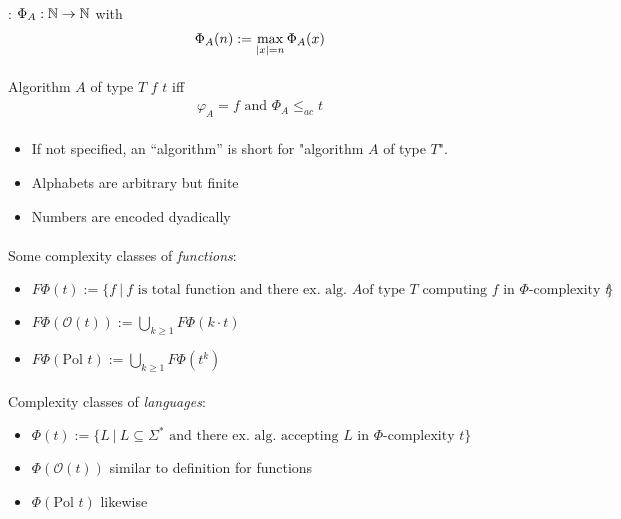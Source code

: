 \documentclass[10pt,twocolumn]{article}
\begin{document}
\paragraph{} : $\Phi_A : \mathbb{N}
\rightarrow \mathbb{N}$ with
\begin{align*}
  \Phi_A(n) := \max_{\lvert x \rvert=n} \Phi_A(x)
\end{align*}

\paragraph{} Algorithm $A$ of type $T$  $f$  $t$ iff
\begin{align*}
\text{
  $\varphi_A=f$ and $\Phi_A \leq_{ac} t$
  }
\end{align*}

\paragraph{}
\begin{itemize}
\item If not specified, an ``algorithm'' is short for "algorithm $A$ of type
  $T$".
\item Alphabets are arbitrary but finite
\item Numbers are encoded dyadically
\end{itemize}

\paragraph{} Some complexity classes of \textit{functions}:
\begin{itemize}
\item $F \Phi(t) := \{ f ~|~ \text{$f$ is total function and there ex. alg. $A$
    of type $T$ computing $f$ in $\Phi$-complexity $t$}\}$
\item $F \Phi( \mathcal{O}(t) ) := \bigcup_{k \geq 1} F \Phi (k \cdot t)$
\item $F \Phi( \text{Pol~} t ) := \bigcup_{k \geq 1} F \Phi(t^k)$
\end{itemize}

\paragraph{} Complexity classes of \textit{languages}:
\begin{itemize}
\item $\Phi(t) := \{ L ~|~  \text{$L \subseteq \Sigma^*$ and there ex. alg.
    accepting $L$ in $\Phi$-complexity $t$} \}$
\item $\Phi(\mathcal{O}(t))$ similar to definition for functions
\item $\Phi( \text{Pol~} t)$ likewise
\end{itemize}
\end{document}
